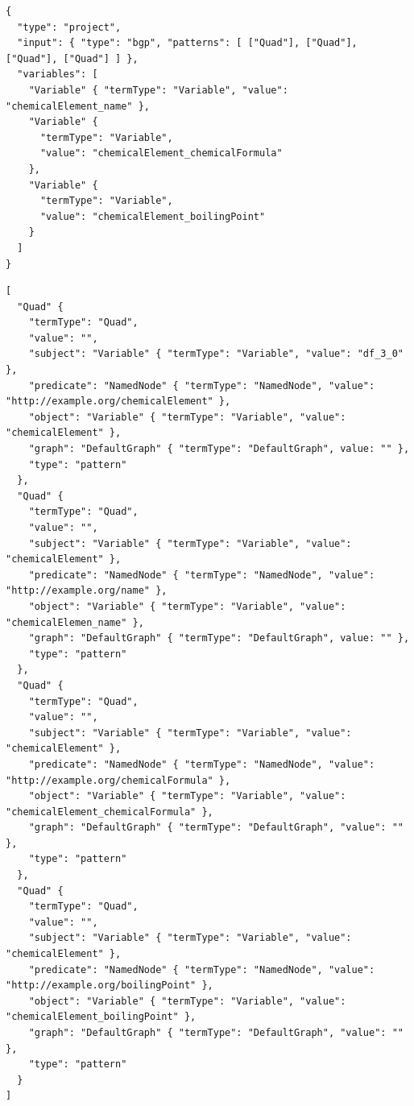\begin{minipage}{\linewidth}
\begin{lstlisting}[label=lst:10, caption={Generated SPARQL Algebra expression}, language=GraphQLException]
{
  "type": "project",
  "input": { "type": "bgp", "patterns": [ ["Quad"], ["Quad"], ["Quad"], ["Quad"] ] },
  "variables": [
    "Variable" { "termType": "Variable", "value": "chemicalElement_name" },
    "Variable" {
      "termType": "Variable",
      "value": "chemicalElement_chemicalFormula"
    },
    "Variable" {
      "termType": "Variable",
      "value": "chemicalElement_boilingPoint"
    }
  ]
}
\end{lstlisting}
\end{minipage}

\begin{minipage}{\linewidth}
\begin{lstlisting}[columns=fullflexible, label=lst:11, caption={The expansion of Quads}, language=GraphQLException2]
[
  "Quad" {
    "termType": "Quad",
    "value": "",
    "subject": "Variable" { "termType": "Variable", "value": "df_3_0" },
    "predicate": "NamedNode" { "termType": "NamedNode", "value": "http://example.org/chemicalElement" },
    "object": "Variable" { "termType": "Variable", "value": "chemicalElement" },
    "graph": "DefaultGraph" { "termType": "DefaultGraph", value: "" },
    "type": "pattern"
  },
  "Quad" {
    "termType": "Quad",
    "value": "",
    "subject": "Variable" { "termType": "Variable", "value": "chemicalElement" },
    "predicate": "NamedNode" { "termType": "NamedNode", "value": "http://example.org/name" },
    "object": "Variable" { "termType": "Variable", "value": "chemicalElemen_name" },
    "graph": "DefaultGraph" { "termType": "DefaultGraph", value: "" },
    "type": "pattern"
  },
  "Quad" {
    "termType": "Quad",
    "value": "",
    "subject": "Variable" { "termType": "Variable", "value": "chemicalElement" },
    "predicate": "NamedNode" { "termType": "NamedNode", "value": "http://example.org/chemicalFormula" },
    "object": "Variable" { "termType": "Variable", "value": "chemicalElement_chemicalFormula" },
    "graph": "DefaultGraph" { "termType": "DefaultGraph", "value": "" },
    "type": "pattern"
  },
  "Quad" {
    "termType": "Quad",
    "value": "",
    "subject": "Variable" { "termType": "Variable", "value": "chemicalElement" },
    "predicate": "NamedNode" { "termType": "NamedNode", "value": "http://example.org/boilingPoint" },
    "object": "Variable" { "termType": "Variable", "value": "chemicalElement_boilingPoint" },
    "graph": "DefaultGraph" { "termType": "DefaultGraph", "value": "" },
    "type": "pattern"
  }
]
\end{lstlisting}
\end{minipage}

